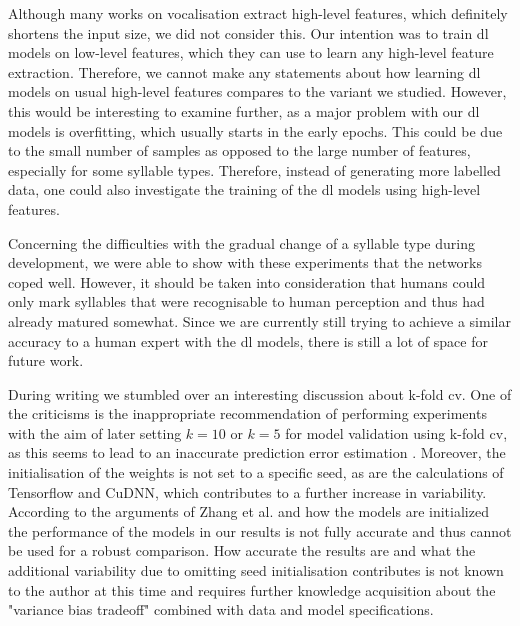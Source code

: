 Although many works on vocalisation extract high-level features, which definitely shortens the input size, we did not consider this. 
Our intention was to train \gls{dl} models on low-level features, which they can use to learn any high-level feature extraction.
Therefore, we cannot make any statements about how learning \gls{dl} models on usual high-level features compares to the variant we studied.
However, this would be interesting to examine further, as a major problem with our \gls{dl} models is overfitting, which usually starts in the early epochs. This could be due to the small number of samples as opposed to the large number of features, especially for some syllable types. Therefore, instead of generating more labelled data, one could also investigate the training of the \gls{dl} models using high-level features.

Concerning the difficulties with the gradual change of a syllable type during development, we were able to show with these experiments that the networks coped well. However, it should be taken into consideration that humans could only mark syllables that were recognisable to human perception and thus had already matured somewhat. Since we are currently still trying to achieve a similar accuracy to a human expert with the \gls{dl} models, there is still a lot of space for future work.


During writing we stumbled over an interesting discussion about k-fold \gls{cv}.
One of the criticisms is the inappropriate recommendation of performing experiments with the aim of later setting $k = 10$ or $k = 5$ for model validation using k-fold \gls{cv}, as this seems to lead to an inaccurate prediction error estimation \cite{Zhang2015}.
Moreover, the initialisation of the weights is not set to a specific seed, as are the calculations of Tensorflow and CuDNN, which contributes to a further increase in variability.
According to the arguments of Zhang et al. \cite{Zhang2015} and how the models are initialized the performance of the models in our results is not fully accurate and thus cannot be used for a robust comparison.
How accurate the results are and what the additional variability due to omitting seed initialisation contributes is not known to the author at this time and requires further knowledge acquisition about the "variance bias tradeoff" combined with data and model specifications.

